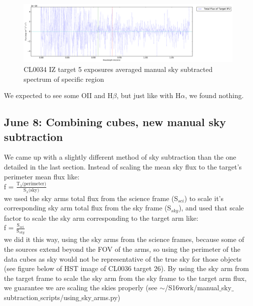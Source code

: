 \documentclass[10pt,letterpaper]{article}
\begin{document}
\begin{figure}[h!]
\caption{CL0034 IZ target 5 exposures averaged manual sky subtracted spectrum of specific region}\label{fig:CL0034 IZ target 5 exposures averaged manual sky subtracted spectrum of specific region}
\includegraphics[scale=0.4]{figures/CL0034-IZ_Target_5_specific_region.pdf}
\end{figure}

We expected to see some OII and H$\beta$, but just like with H$\alpha$, we found nothing.

\subsection{June 8: Combining cubes, new manual sky subtraction}
We came up with a slightly different method of sky subtraction than the one detailed in the last section. Instead of scaling the mean sky flux to the target's perimeter mean flux like:\\
f = $\frac{\text{T}_{\lambda}\text{(perimeter)}}{\text{S}_{\lambda}\text{(sky)}}$\\
we used the sky arms total flux from the science frame (S$_{sci}$) to scale it's corresponding sky arm total flux from the sky frame (S$_{sky}$), and used that scale factor to scale the sky arm corresponding to the target arm like:\\
f = $\frac{\text{S}_{sci}}{\text{S}_{sky}}$\\
we did it this way, using the sky arms from the science frames, because some of the sources extend beyond the FOV of the arms, so using the perimeter of the data cubes as sky would not be representative of the true sky for those objects (see figure below of HST image of CL0036 target 26). By using the sky arm from the target frame to scale the sky arm from the sky frame to the target arm flux, we guarantee we are scaling the skies properly (see $\sim$/S16work/manual$\_$sky$\_$subtraction$\_$scripts/using$\_$sky$\_$arms.py)\\
\end{document}
